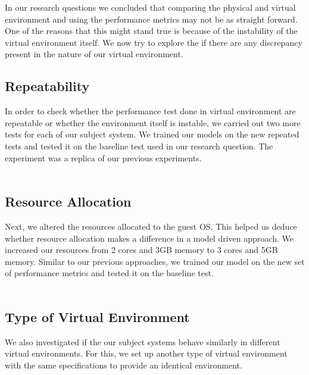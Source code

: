 In our research questions we concluded that comparing the physical and virtual environment and using the performance metrics may not be as straight forward. One of the reasons that this might stand true is because of the instability of the virtual environment itself. We now try to explore the if there are any discrepancy present in the nature of our virtual environment.

\subsection{Repeatability}
In order to check whether the performance test done in virtual environment are repeatable or whether the environment itself is instable, we carried out two more tests for each of our subject system. We trained our models on the new repeated tests and tested it on the baseline test used in our research question. The experiment was a replica of our previous experiments.
\\
\\




\subsection{Resource Allocation}
Next, we altered the resources allocated to the guest OS. This helped us deduce whether resource allocation makes a difference in a model driven approach. We increased our resources from 2 cores and 3GB memory to 3 cores and 5GB memory. Similar to our previous approaches, we trained our model on the new set of performance metrics and tested it on the baseline test.
\\
\\


\subsection{Type of Virtual Environment}

We also investigated if the our subject systems behave similarly in different virtual environments. For this, we set up another type of virtual environment with the same specifications to provide an identical environment. 

\fbox{\textit{}}